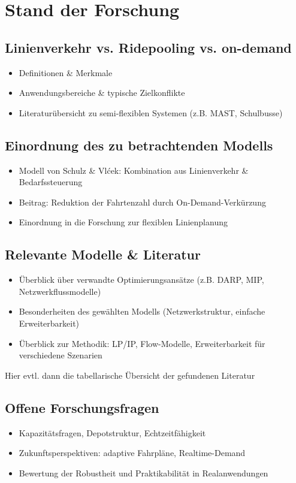 \chapter{Stand der Forschung}
\section{Linienverkehr vs. Ridepooling vs. on-demand}
\begin{itemize}
    \item Definitionen \& Merkmale
    \item Anwendungsbereiche \& typische Zielkonflikte
    \item Literaturübersicht zu semi-flexiblen Systemen (z.B. MAST, Schulbusse)
\end{itemize}

\section{Einordnung des zu betrachtenden Modells}

\begin{itemize}
    \item Modell von Schulz \& Vlćek: Kombination aus Linienverkehr \& Bedarfssteuerung
    \item Beitrag: Reduktion der Fahrtenzahl durch On-Demand-Verkürzung
    \item Einordnung in die Forschung zur flexiblen Linienplanung
\end{itemize}

\section{Relevante Modelle \& Literatur}
\begin{itemize}
    \item Überblick über verwandte Optimierungsansätze (z.B. DARP, MIP, Netzwerkflussmodelle)
    \item Besonderheiten des gewählten Modells (Netzwerkstruktur, einfache Erweiterbarkeit)
    \item Überblick zur Methodik: LP/IP, Flow-Modelle, Erweiterbarkeit für verschiedene Szenarien
\end{itemize}

Hier evtl. dann die tabellarische Übersicht der gefundenen Literatur

\section{Offene Forschungsfragen}
\begin{itemize}
    \item Kapazitätsfragen, Depotstruktur, Echtzeitfähigkeit
    \item Zukunftsperspektiven: adaptive Fahrpläne, Realtime-Demand
    \item Bewertung der Robustheit und Praktikabilität in Realanwendungen
\end{itemize}

